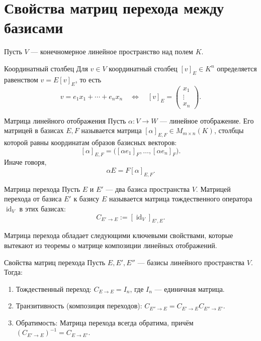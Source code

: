 
\section{Свойства матриц перехода между базисами}

Пусть $V$ --- конечномерное линейное пространство над полем $K$.

\begin{Definition}{Координатный столбец}{}
	Для $v\in V$ координатный столбец $[v]_E\in K^n$ определяется равенством
	$v=E[v]_E$, то есть
	\[
	v=e_1x_1+\cdots+e_nx_n
	\quad \Longleftrightarrow \quad
	[v]_E=
	\begin{pmatrix}
		x_1\\
		\vdots\\
		x_n
	\end{pmatrix}.
	\]
\end{Definition}

\begin{Definition}{Матрица линейного отображения}{}
	Пусть $\alpha\colon V\to W$ --- линейное отображение. Его матрицей в базисах $E,F$ называется матрица $[\alpha]_{E,F}\in M_{m\times n}(K)$, столбцы которой равны координатам образов базисных векторов:
	\[
	[\alpha]_{E,F}
	=
	\bigl(
	[\alpha e_1]_F,\ldots,[\alpha e_n]_F
	\bigr).
	\]
	Иначе говоря,
	\[
	\alpha E=F[\alpha]_{E,F}.
	\]
\end{Definition}

\begin{Definition}{Матрица перехода}{}
	Пусть $E$ и $E'$ --- два базиса пространства $V$. Матрицей перехода от базиса $E'$ к базису $E$ называется матрица тождественного оператора $\operatorname{id}_V$ в этих базисах:
	\[
	C_{E'\to E} := [\operatorname{id}_V]_{E',E}.
	\]
\end{Definition}

Матрица перехода обладает следующими ключевыми свойствами, которые вытекают из теоремы о матрице композиции линейных отображений.

\begin{Theorem}{Свойства матриц перехода}{}
	Пусть $E, E', E''$ --- базисы линейного пространства $V$. Тогда:
	\begin{enumerate}
		\item Тождественный переход: $C_{E\to E} = I_n$, где $I_n$ --- единичная матрица.
		\item Транзитивность (композиция переходов): $C_{E''\to E} = C_{E'\to E} C_{E''\to E'}$.
		\item Обратимость: Матрица перехода всегда обратима, причём $(C_{E'\to E})^{-1} = C_{E\to E'}$.
	\end{enumerate}
\end{Theorem}

